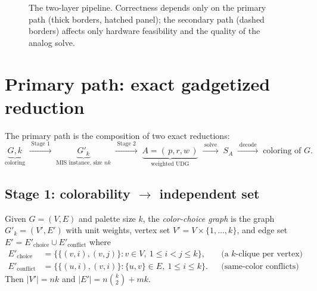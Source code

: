 \documentclass[a4paper,fleqn]{cas-sc}
\begin{document}
\begin{figure}[tb]
{}
\caption{The two-layer pipeline. Correctness depends only on the primary path (thick
borders, hatched panel); the secondary path (dashed borders) affects only hardware
feasibility and the quality of the analog solve.}
\label{fig:overview}
\end{figure}

\section{Primary path: exact gadgetized reduction}
\label{sec:gadget}

The primary path is the composition of two exact reductions:
\[
  \underbrace{G,k}_{\text{coloring}}
  \;\xrightarrow{\;\text{Stage 1}\;}\;
  \underbrace{G'_k}_{\text{MIS instance, size }nk}
  \;\xrightarrow{\;\text{Stage 2}\;}\;
  \underbrace{A=(\,p,r,w\,)}_{\text{weighted UDG}}
  \;\xrightarrow{\;\text{solve}\;}\;
  S_A
  \;\xrightarrow{\;\text{decode}\;}\;
  \text{coloring of }G.
\]

\subsection{\texorpdfstring{Stage 1: colorability $\to$ independent set}{Stage 1: colorability to independent set}}
\label{sec:col2is}

\begin{definition}
\label{def:choice}
Given $G=(V,E)$ and palette size $k$, the \emph{color-choice graph} is the graph
$G'_k=(V',E')$ with unit weights, vertex set $V'=V\times\{1,\dots,k\}$, and edge set
$E'=E'_{\mathrm{choice}}\cup E'_{\mathrm{conflict}}$ where
\begin{align*}
  E'_{\mathrm{choice}}   &= \bigl\{\{(v,i),(v,j)\} : v\in V,\ 1\le i<j\le k\bigr\},
   &&\text{(a $k$-clique per vertex)}\\
  E'_{\mathrm{conflict}} &= \bigl\{\{(u,i),(v,i)\} : \{u,v\}\in E,\ 1\le i\le k\bigr\}.
   &&\text{(same-color conflicts)}
\end{align*}
Then $|V'|=nk$ and $|E'|=n\binom{k}{2}+mk$.
\end{definition}
\end{document}
